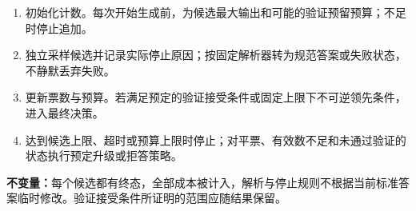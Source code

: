 \documentclass[../textbook.tex]{subfiles}
\begin{document}
\begin{algorithm}[有预算的候选聚合与验证]
\begin{enumerate}
\item 初始化计数。每次开始生成前，为候选最大输出和可能的验证预留预算；不足时停止追加。
\item 独立采样候选并记录实际停止原因；按固定解析器转为规范答案或失败状态，不静默丢弃失败。
\item 更新票数与预算。若满足预定的验证接受条件或固定上限下不可逆领先条件，进入最终决策。
\item 达到候选上限、超时或预算上限时停止；对平票、有效数不足和未通过验证的状态执行预定升级或拒答策略。
\end{enumerate}
\textbf{不变量：}每个候选都有终态，全部成本被计入，解析与停止规则不根据当前标准答案临时修改。验证接受条件所证明的范围应随结果保留。
\end{algorithm}
\end{document}

